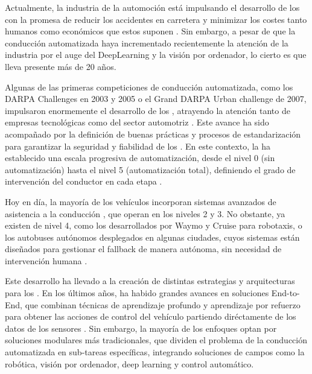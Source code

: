 
Actualmente, la industria de la automoción está impulsando el desarrollo de los  con la promesa de reducir los accidentes en carretera y minimizar los costes tanto humanos como económicos que estos suponen \cite{survey_AutomatedDriving1}. Sin embargo, a pesar de que la conducción automatizada haya incrementado recientemente la atención de la industria por el auge del DeepLearning y la visión por ordenador, lo cierto es que lleva presente más de 20 años.

Algunas de las primeras competiciones de conducción automatizada, como los DARPA Challenges en 2003 y 2005 o el Grand DARPA Urban challenge de 2007, impulsaron enormemente el desarrollo de los , atrayendo la atención tanto de empresas tecnológicas como del sector automotriz \cite{survey_AutomatedDriving2}. Este avance ha sido acompañado por la definición de buenas prácticas y procesos de estandarización para garantizar la seguridad y fiabilidad de los . En este contexto, la  ha establecido una escala progresiva de automatización, desde el nivel 0 (sin automatización) hasta el nivel 5 (automatización total), definiendo el grado de intervención del conductor en cada etapa \cite{AD_Technical_Standards}. 

Hoy en día, la mayoría de los vehículos incorporan sistemas avanzados de asistencia a la conducción , que operan en los niveles  2 y 3. No obstante, ya existen  de nivel 4, como los desarrollados por Waymo y Cruise para robotaxis, o los autobuses autónomos desplegados en algunas ciudades, cuyos sistemas están diseñados para gestionar el fallback de manera autónoma, sin necesidad de intervención humana \cite{fallback_strategy}.

Este desarrollo ha llevado a la creación de distintas estrategias y arquitecturas para los . En los últimos años, ha habido grandes avances en soluciones \mbox{End-to-End}, que combinan técnicas de aprendizaje profundo y aprendizaje por refuerzo para obtener las acciones de control del vehículo partiendo diréctamente de los datos de los sensores \cite{end_to_end_driving}. Sin embargo, la mayoría de los enfoques optan por soluciones modulares más tradicionales, que dividen el problema de la conducción automatizada en \mbox{sub-tareas} específicas, integrando soluciones de campos como la robótica, visión por ordenador, deep learning y control automático.

